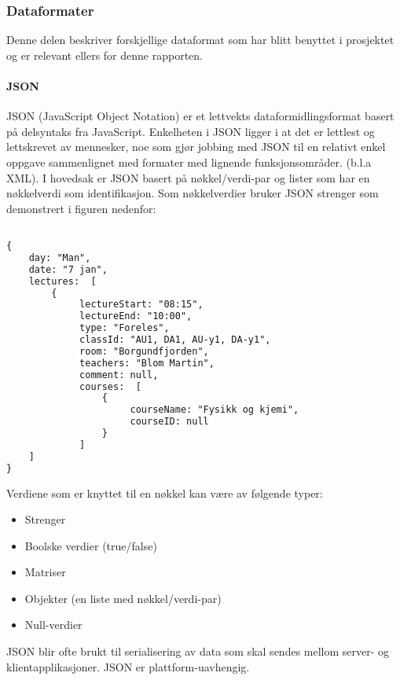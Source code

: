 \documentclass[../main.tex]{subfiles}
\begin{document}
\subsubsection{Dataformater}

Denne delen beskriver forskjellige dataformat som har blitt benyttet i prosjektet og er relevant ellers for denne rapporten.

\paragraph{JSON}
JSON (JavaScript Object Notation) er et lettvekts dataformidlingsformat basert på delsyntaks fra JavaScript. Enkelheten i JSON ligger i at det er lettlest og lettskrevet av mennesker, noe som gjør jobbing med JSON til en relativt enkel oppgave sammenlignet med formater med lignende funksjonsområder. (b.l.a XML).\newline
I hovedsak er JSON basert på nøkkel/verdi-par og lister som har en nøkkelverdi som identifikasjon. Som nøkkelverdier bruker JSON strenger som demonstrert i figuren nedenfor:

\begin{lstlisting}[language=HTML, frame=single, caption={(JSON-formatert data)}]

{
    day: "Man",
    date: "7 jan",
    lectures:  [
        {
             lectureStart: "08:15",
             lectureEnd: "10:00",
             type: "Foreles",
             classId: "AU1, DA1, AU-y1, DA-y1",
             room: "Borgundfjorden",
             teachers: "Blom Martin",
             comment: null,
             courses:  [
                 {
                      courseName: "Fysikk og kjemi",
                      courseID: null
                 }
             ]
    ]
}

\end{lstlisting}

Verdiene som er knyttet til en nøkkel kan være av følgende typer:
\begin{itemize}
\item Strenger
\item Boolske verdier (true/false)
\item Matriser
\item Objekter (en liste med nøkkel/verdi-par)
\item Null-verdier
\end{itemize}

JSON blir ofte brukt til serialisering av data som skal sendes mellom server- og klientapplikasjoner. JSON er plattform-uavhengig.   
\end{document}
